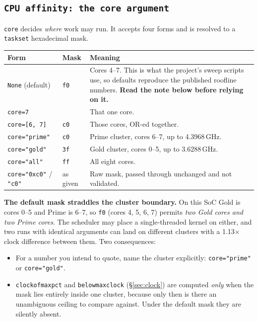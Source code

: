 \documentclass[11pt,a4paper]{article}
\newcommand{\code}[1]{\texttt{\let\_\breakableunderscore #1}}
\newcommand{\breakableunderscore}{\textunderscore\allowbreak}
\newcommand{\apient}[1]{\subsection{\texttt{#1}}}
\begin{document}
\apient{CPU affinity: the \texttt{core} argument}
\label{sec:affinity}

\code{core} decides \emph{where} work may run. It accepts four forms and is
resolved to a \code{taskset} hexadecimal mask.

\begin{longtable}{@{}p{3.6cm}p{1.6cm}p{9.5cm}@{}}
\toprule
\textbf{Form} & \textbf{Mask} & \textbf{Meaning} \\
\midrule
\endhead
\code{None} (default) & \code{f0} & Cores 4--7. This is what the project's sweep
  scripts use, so defaults reproduce the published roofline numbers.
  \textbf{Read the note below before relying on it.} \\
\code{core=7} & \code{80} & That one core. \\
\code{core=[6, 7]} & \code{c0} & Those cores, OR-ed together. \\
\code{core="prime"} & \code{c0} & Prime cluster, cores 6--7, up to 4.3968\,GHz. \\
\code{core="gold"} & \code{3f} & Gold cluster, cores 0--5, up to 3.6288\,GHz. \\
\code{core="all"} & \code{ff} & All eight cores. \\
\code{core="0xc0"} / \code{"c0"} & as given & Raw mask, passed through
  unchanged and not validated. \\
\bottomrule
\end{longtable}

\noindent\textbf{The default mask straddles the cluster boundary.} On this SoC
Gold is cores 0--5 and Prime is 6--7, so \code{f0} (cores 4, 5, 6, 7) permits
\emph{two Gold cores and two Prime cores}. The scheduler may place a
single-threaded kernel on either, and two runs with identical arguments can
land on different clusters with a 1.13$\times$ clock difference between them.
Two consequences:

\begin{itemize}[leftmargin=0.6cm]
  \item For a number you intend to quote, name the cluster explicitly:
    \code{core="prime"} or \code{core="gold"}.
  \item \code{clock\_of\_max\_pct} and \code{below\_max\_clock}
    (\S\ref{sec:clock}) are computed \emph{only} when the mask lies entirely
    inside one cluster, because only then is there an unambiguous ceiling to
    compare against. Under the default mask they are silently absent.
\end{itemize}
\end{document}
